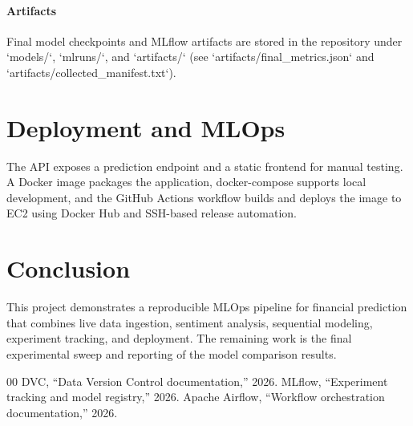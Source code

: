 \documentclass[conference]{IEEEtran}
\begin{document}
\paragraph{Artifacts}
Final model checkpoints and MLflow artifacts are stored in the repository under `models/`, `mlruns/`, and `artifacts/` (see `artifacts/final_metrics.json` and `artifacts/collected_manifest.txt`).

\section{Deployment and MLOps}
The API exposes a prediction endpoint and a static frontend for manual testing. A Docker image packages the application, docker-compose supports local development, and the GitHub Actions workflow builds and deploys the image to EC2 using Docker Hub and SSH-based release automation.

\section{Conclusion}
This project demonstrates a reproducible MLOps pipeline for financial prediction that combines live data ingestion, sentiment analysis, sequential modeling, experiment tracking, and deployment. The remaining work is the final experimental sweep and reporting of the model comparison results.


\begin{thebibliography}{00}
 DVC, ``Data Version Control documentation,'' 2026.
 MLflow, ``Experiment tracking and model registry,'' 2026.
 Apache Airflow, ``Workflow orchestration documentation,'' 2026.
\end{thebibliography}
\end{document}
